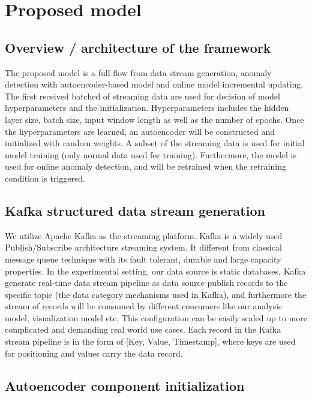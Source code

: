 \chapter{Proposed model}
\label{Proposed model}

\section{Overview / architecture of the framework}
\label{sec:Overview / architecture of the framework}

The proposed model is a full flow from data stream generation, anomaly detection with autoencoder-based model and online model incremental updating. The first received batched of streaming data are used for decision of model hyperparameters and the initialization. Hyperparameters includes the hidden layer size, batch size, input window length as well as the number of epochs. Once the hyperparameters are learned, an autoencoder will be constructed and initialized with random weights. A subset of the streaming data is used for initial model training (only normal data used for training). Furthermore, the model is used for online anomaly detection, and will be retrained when the retraining condition is triggered. 

\section{Kafka structured data stream generation}
\label{sec:Kafka structured data stream generation}

We utilize Apache Kafka as the streaming platform. Kafka is a widely used Publish/Subscribe architecture streaming system. It different from classical message queue technique with its fault tolerant, durable and large capacity properties. In the experimental setting, our data source is static databases, Kafka generate real-time data stream pipeline as data source publish records to the specific topic (the data category mechanisms used in Kafka), and furthermore the stream of records will be consumed by different consumers like our analysis model, visualization model etc. This configuration can be easily scaled up to more complicated and demanding real world use cases. Each record in the Kafka stream pipeline is in the form of [Key, Value, Timestamp], where keys are used for positioning and values carry the data record.

\section{Autoencoder component initialization}
\label{sec:}


